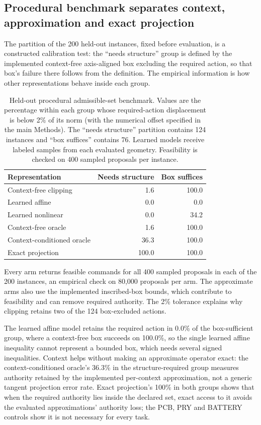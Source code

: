 \documentclass[10pt]{article}
\begin{document}
\subsection{Procedural benchmark separates context, approximation and exact projection}

The partition of the 200 held-out instances, fixed before evaluation, is a
constructed calibration test: the ``needs structure'' group is defined by the
implemented context-free axis-aligned box excluding the required action, so
that box's failure there follows from the definition. The empirical
information is how other representations behave inside each group.

\begin{table}[htbp]
\centering
\caption{Held-out procedural admissible-set benchmark. Values are the
percentage within each group whose required-action displacement is below
2\% of its norm (with the numerical offset specified in the main Methods). The
``needs structure'' partition contains 124 instances and ``box suffices''
contains 76. Learned models receive labeled samples from each evaluated
geometry. Feasibility is checked on 400 sampled proposals per instance.}
\label{tab:procedural-geometry}
\begin{tabular}{lrr}
\toprule
Representation & Needs structure & Box suffices\\
\midrule
Context-free clipping & 1.6 & 100.0\\
Learned affine & 0.0 & 0.0\\
Learned nonlinear & 0.0 & 34.2\\
Context-free oracle & 1.6 & 100.0\\
Context-conditioned oracle & 36.3 & 100.0\\
Exact projection & 100.0 & 100.0\\
\bottomrule
\end{tabular}
\end{table}

Every arm returns feasible commands for all 400 sampled proposals in each of
the 200 instances, an empirical check on 80,000 proposals per arm. The approximate arms also use the implemented
inscribed-box bounds, which contribute to feasibility and can remove required
authority. The 2\% tolerance explains why clipping retains two of the 124
box-excluded actions.

The learned affine model retains the required action in 0.0\% of the
box-sufficient group, where a context-free box succeeds on 100.0\%, so the single learned affine inequality cannot represent a bounded box, which needs several signed inequalities. Context helps without making an approximate operator
exact: the context-conditioned oracle's 36.3\% in the structure-required group
measures authority retained by the implemented per-context approximation, not
a generic tangent projection error rate. Exact projection's 100\% in both
groups shows that when the required authority lies inside the declared set,
exact access to it avoids the evaluated approximations' authority loss; the
PCB, PRY and BATTERY controls show it is not necessary for every task.
\end{document}
